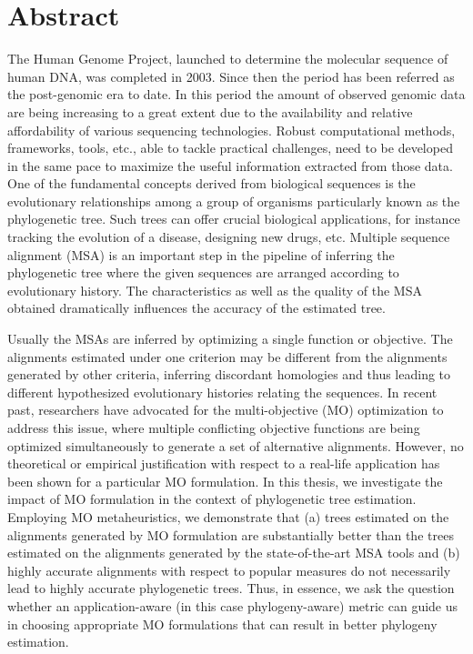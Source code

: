 \chapter*{Abstract}
The Human Genome Project, launched to determine the molecular sequence of human DNA, was completed in 2003. Since then the period has been referred as the post-genomic era to date. In this period the amount of observed genomic data are being increasing to a great extent due to the availability and relative affordability of various sequencing technologies. Robust computational methods, frameworks, tools, etc., able to tackle practical challenges, need to be developed in the same pace to maximize the useful information extracted from those data. One of the fundamental concepts derived from biological sequences is the evolutionary relationships among a group of organisms particularly known as the phylogenetic tree. Such trees can offer crucial biological applications, for instance tracking the evolution of a disease, designing new drugs, etc. Multiple sequence alignment (MSA) is an important step in the pipeline of inferring the phylogenetic tree where the given sequences are arranged according to evolutionary history. The characteristics as well as the quality of the MSA obtained dramatically influences the accuracy of the estimated tree. 

Usually the MSAs are inferred by optimizing a single function or objective. The alignments estimated under one criterion may be different from the alignments generated by other criteria, inferring discordant homologies and thus leading to different hypothesized evolutionary histories relating the sequences. In recent past, researchers have advocated for the multi-objective (MO) optimization to address this issue, where multiple conflicting objective functions are being optimized simultaneously to generate a set of alternative alignments. However, no theoretical or empirical justification with respect to a real-life application has been shown for a particular MO formulation. In this thesis, we investigate the impact of MO formulation in the context of phylogenetic tree estimation. Employing MO metaheuristics, we demonstrate that (a) trees estimated on the alignments generated by MO formulation are substantially better than the trees estimated on the alignments generated by the state-of-the-art MSA tools and (b) highly accurate alignments with respect to popular measures do not necessarily lead to highly accurate phylogenetic trees. Thus, in essence, we ask the question whether an application-aware (in this case phylogeny-aware) metric can guide us in choosing appropriate MO formulations that can result in better phylogeny estimation. %

